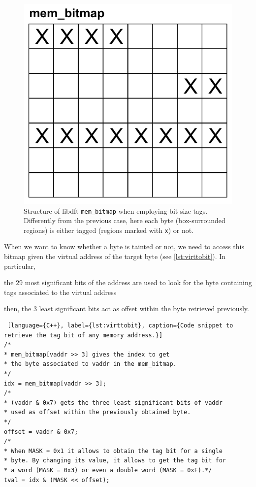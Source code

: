 \documentclass[LaM,binding=0.6cm]{sapthesis}
\begin{document}
\begin{itemize}
\begin{figure}[h!]
\centering
\includegraphics[scale=.6]{images/techn11}
\caption{Structure of libdft \texttt{mem\_bitmap} when employing bit-size tags. Differently from the previous case, here each byte (box-surrounded regions) is either tagged (regions marked with \texttt{x}) or not.}
\end{figure}

When we want to know whether a byte is tainted or not, we need to access this bitmap given the virtual address of the target byte (see \autoref{lst:virttobit}). In particular, 
\begin{enumerate*}[label=\roman*),itemjoin={,\quad}]
\item the $29$ most significant bits of the address are used to look for the byte containing tags associated to the virtual address
\item then, the $3$ least significant bits act as offset within the byte retrieved previously.
\end{enumerate*}
\begin{lstlisting} [language={C++}, label={lst:virttobit}, caption={Code snippet to retrieve the tag bit of any memory address.}]
/*
* mem_bitmap[vaddr >> 3] gives the index to get
* the byte associated to vaddr in the mem_bitmap.
*/
idx = mem_bitmap[vaddr >> 3];
/*
* (vaddr & 0x7) gets the three least significant bits of vaddr
* used as offset within the previously obtained byte.
*/
offset = vaddr & 0x7;
/*
* When MASK = 0x1 it allows to obtain the tag bit for a single
* byte. By changing its value, it allows to get the tag bit for
* a word (MASK = 0x3) or even a double word (MASK = 0xF).*/
tval = idx & (MASK << offset);
\end{lstlisting}
\end{itemize}
\end{document}

